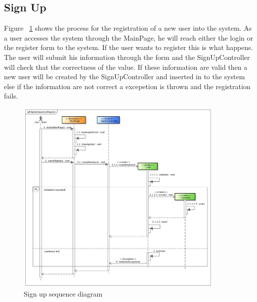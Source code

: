 \subsection{Sign Up}
Figure ~\ref{fig:signupSeq} shows the process for the registration of a new user into the system. As a user accesses the system through the MainPage, he will reach either the login or the register form to the system. If the user wants to register this is what happens.
The user will submit his information through the form and the SignUpController will check that the correctness of the value. If these information are valid then a new user will be created by the SignUpController and inserted in to the system else if the information are not correct a excepetion is thrown and the registration fails. 
\begin{center}
 \begin{figure}[H]
    \includegraphics[width=0.9\textwidth]{../BCEDiagram/BCE/EntityOverview/SignUpSequenceDiagram.png}
    \caption{Sign up sequence diagram}
     \label{fig:signupSeq}
     \end{figure}
   \end{center}  
  
